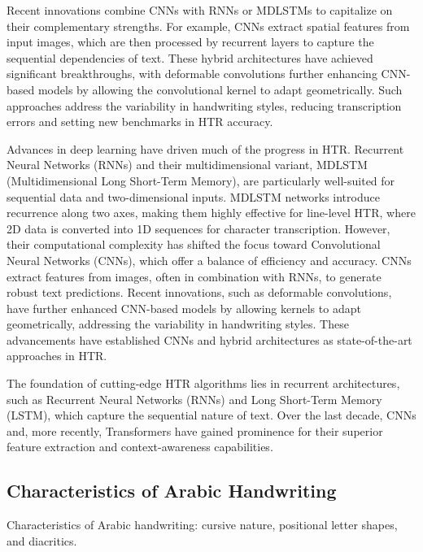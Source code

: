 \documentclass[conference]{IEEEtran}
\begin{document}
Recent innovations combine CNNs with RNNs or MDLSTMs to capitalize on their complementary strengths. For example, CNNs extract spatial features from input images, which are then processed by recurrent layers to capture the sequential dependencies of text. These hybrid architectures have achieved significant breakthroughs, with deformable convolutions further enhancing CNN-based models by allowing the convolutional kernel to adapt geometrically. Such approaches address the variability in handwriting styles, reducing transcription errors and setting new benchmarks in HTR accuracy.




Advances in deep learning have driven much of the progress in HTR. Recurrent Neural Networks (RNNs) and their multidimensional variant, MDLSTM (Multidimensional Long Short-Term Memory), are particularly well-suited for sequential data and two-dimensional inputs. MDLSTM networks introduce recurrence along two axes, making them highly effective for line-level HTR, where 2D data is converted into 1D sequences for character transcription. However, their computational complexity has shifted the focus toward Convolutional Neural Networks (CNNs), which offer a balance of efficiency and accuracy. CNNs extract features from images, often in combination with RNNs, to generate robust text predictions. Recent innovations, such as deformable convolutions, have further enhanced CNN-based models by allowing kernels to adapt geometrically, addressing the variability in handwriting styles. These advancements have established CNNs and hybrid architectures as state-of-the-art approaches in HTR.









The foundation of cutting-edge HTR algorithms lies in recurrent architectures, such as Recurrent Neural Networks (RNNs) and Long Short-Term Memory (LSTM), which capture the sequential nature of text. Over the last decade, CNNs and, more recently, Transformers have gained prominence for their superior feature extraction and context-awareness capabilities.




\subsection{Characteristics of Arabic Handwriting}

Characteristics of Arabic handwriting: cursive nature, positional letter shapes, and diacritics.
\end{document}
